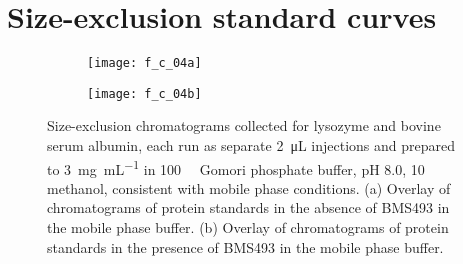 \section{Size-exclusion standard curves}

\begin{figure}
    \centering
    \begin{subfigure}[b]{0.8\textwidth}
        \texttt{[image: f\_c\_04a]}
        \caption{}
    \end{subfigure}
    \begin{subfigure}[b]{0.8\textwidth}
        \texttt{[image: f\_c\_04b]}
        \caption{}
    \end{subfigure}
    \caption{Size-exclusion chromatograms collected for lysozyme and bovine
        serum albumin, each run as separate \SI{2}{\micro\liter} injections and
        prepared to \SI{3}{\mg\per\mL} in \SI{100}{\milli\moLar} Gomori
        phosphate buffer, pH 8.0, \SI{10}{\volper} methanol, consistent with
        mobile phase conditions. (a) Overlay of chromatograms of protein
        standards in the absence of BMS493 in the mobile phase buffer. (b)
        Overlay of chromatograms of protein standards in the presence of BMS493
        in the mobile phase buffer.}\label{fig:sec_standards}
\end{figure}
